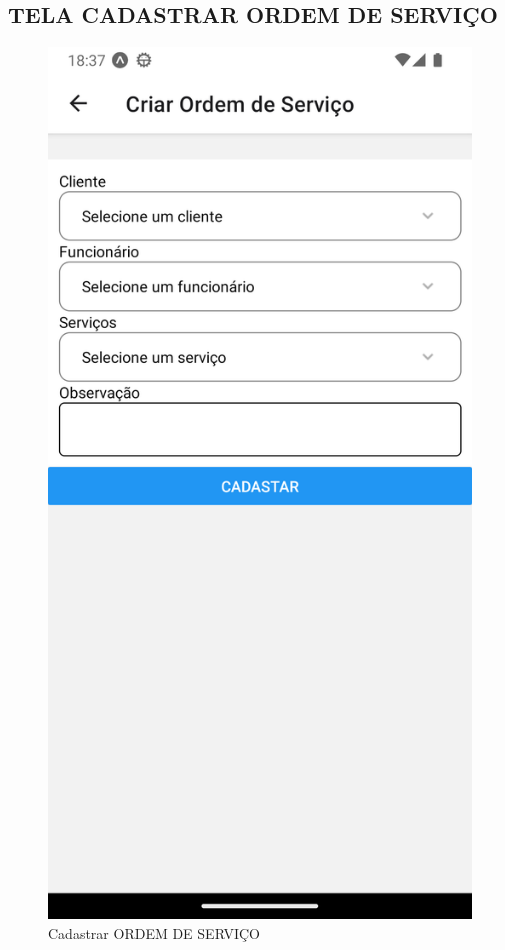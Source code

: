 \subsection{TELA CADASTRAR ORDEM DE SERVIÇO}
\begin{figure}[htb]
	\caption{\label{fig_diagrama-classes} Cadastrar ORDEM DE SERVIÇO}
	\begin{center}
	    \includegraphics[width=0.5\linewidth]{imagens/criar-OS.png}
	\end{center}
\end{figure}

\newpage

